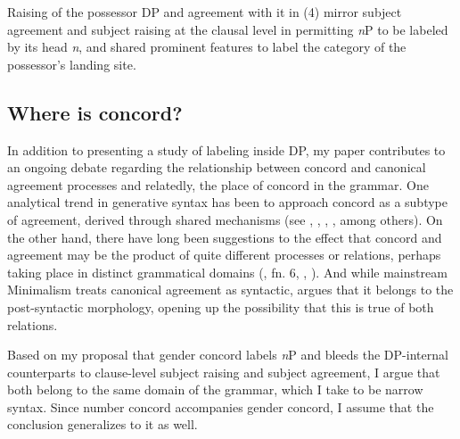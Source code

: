 \documentclass[output=paper
,modfonts
,nonflat]{langsci/langscibook}
\begin{document}
Raising of the possessor DP and agreement with it in (4) mirror subject agreement and subject raising at the clausal level in permitting \textit{n}P to be labeled by its head \textit{n}, and shared prominent features to label the category of the possessor's landing site. 

\subsection{Where is concord?} 
In addition to presenting a study of labeling inside DP, my paper contributes to an ongoing debate regarding the relationship between concord and canonical agreement processes and relatedly, the place of concord in the grammar. One analytical trend in generative syntax has been to approach concord as a subtype of agreement, derived through shared mechanisms (see \citealt{Baker2008}, \citealt{Carstens1991, Carstens2000, Carstens2011}, \citealt{Danon2011}, \citealt{Koopman2006}, \citealt{Toosarvandani_Van_Urk2014} among others). On the other hand, there have long been suggestions to the effect that concord and agreement may be the product of quite different processes or relations, perhaps taking place in distinct grammatical domains (\citealt{Baier2015}, \citealt{Chomsky2001} fn. 6, \citealt{Chung2013}, \citealt{Norris2014}). And while mainstream Minimalism treats canonical agreement as syntactic, \citet{Bobaljik2008} argues that it belongs to the post-syntactic morphology, opening up the possibility that this is true of both relations. 

Based on my proposal that gender concord labels \textit{n}P and bleeds the DP-internal counterparts to clause-level subject raising and subject agreement, I argue that both belong to the same domain of the grammar, which I take to be narrow syntax. Since number concord accompanies gender concord, I assume that the conclusion generalizes to it as well. 
\end{document}
